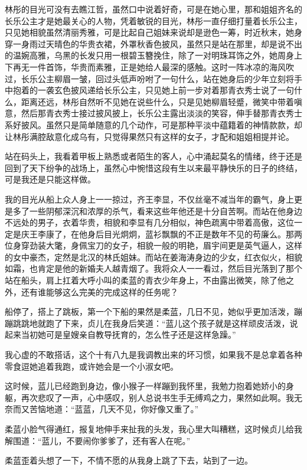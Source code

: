 林彤的目光可没有去瞧江哲，虽然口中说着好奇，可是在她心里，那和姐姐齐名的长乐公主才是她最关心的人物，凭着敏锐的目光，林彤一直仔细打量着长乐公主，只见她相貌虽然清丽秀雅，可是比起自己姐妹来说却是逊色一筹，时近秋末，她身穿一身雨过天晴色的华贵衣裙，外罩秋香色披风，虽然只是站在那里，却是说不出的温婉高雅，乌黑的长发只用一根碧玉簪挽住，除了一对明珠耳饰之外，她周身上下再无一件首饰，华贵而素雅，正是她给人最深的感触。这时一阵冰凉的海风吹过，长乐公主柳眉一皱，回过头低声吩咐了一句什么，站在她身后的少年立刻将手中抱着的一袭玄色披风递给长乐公主，只见她上前一步对着那青衣秀士说了一句什么，距离还远，林彤自然听不见她在说些什么，只是见她柳眉轻蹙，微笑中带着嗔意，然后那青衣秀士接过披风披上，长乐公主露出淡淡的笑容，伸手替那青衣秀士系好披风。虽然只是简单随意的几个动作，可是那种平淡中蕴籍着的神情款款，却让林彤满腔敌意化成乌有，只觉得果然只有这样的女子，才配和姐姐相提并论。

站在码头上，我看着甲板上熟悉或者陌生的客人，心中涌起莫名的情绪，终于还是回到了天下纷争的战场上，虽然心中惋惜这段有生以来最平静快乐的日子的终结，可是我还是只能这样做。

我的目光从船上众人身上一一掠过，齐王李显，不仅丝毫不减当年的霸气，身上更是多了一些阴郁深沉和浓厚的杀气，看来这些年他还是十分自苦啊。而站在他身边不远处的男子，衣着华贵，相貌和李显有几分相似，神色疏离中带着高傲，这位一定是庆王李康了，在他身后目光炯炯，蓝衫飘飘的不正是数年不见的苟廉么。那两位身穿劲装大氅，身佩宝刀的女子，相貌一般的明艳，眉宇间更是英气逼人，这样的女中豪杰，定然是北汉的林氏姐妹。而站在姜海涛身边的少女，红衣似火，相貌如霜，也肯定是他的新婚夫人越青烟了。我将众人一一看过，然后目光落到了那个站在船头，肩上扛着大呼小叫的柔蓝的青衣少年身上，不由露出微笑，除了他之外，还有谁能够这么完美的完成这样的任务呢？

船停了，搭上了跳板，第一个下船的果然是柔蓝，几日不见，她似乎更加活泼，蹦蹦跳跳地就跑了下来，贞儿在我身后笑道：“蓝儿这个孩子就是这样顽皮活泼，说起来当初她可是皇嫂亲自教导抚育的，怎么性子还是这样急躁。”

我心虚的不敢搭话，这个十有八九是我调教出来的坏习惯，如果我不是总拿着各种零食逗她追着我跑，或许她会是一个小淑女吧。

这时候，蓝儿已经跑到身边，像小猴子一样蹦到我怀里，我勉力抱着她娇小的身躯，再次悲叹了一声，心中感叹，别人总说书生手无缚鸡之力，果然如此啊。我无奈而又苦恼地道：“蓝蓝，几天不见，你好像又重了。”

柔蓝小脸气得通红，报复地伸手来扯我的头发，我心里大叫糟糕，这时候贞儿给我解围道：“蓝儿，不要闹你爹爹了，还有客人在呢。”

柔蓝歪着头想了一下，不情不愿的从我身上跳了下去，站到了一边。

